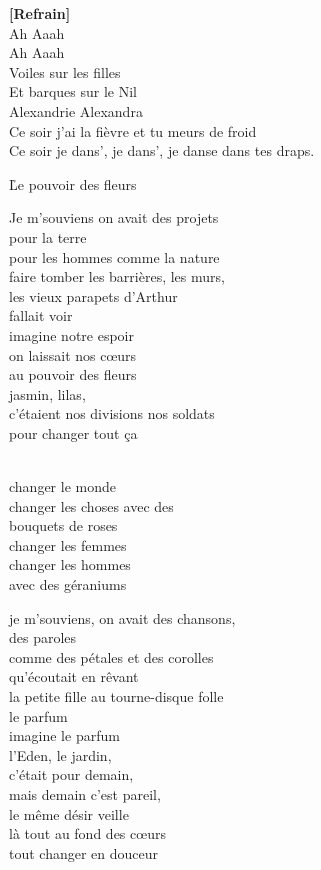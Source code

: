 \documentclass{novel}
\begin{document}
\begin{multicols}{2}
\textbf{[Refrain]} \\

Ah Aaah \\
Ah Aaah \\

Voiles sur les filles \\
Et barques sur le Nil \\
Alexandrie Alexandra \\
Ce soir j'ai la fièvre et tu meurs de froid \\
Ce soir je dans', je dans', je danse dans tes draps. \\
\end{multicols}

\newpage
\footnotesize

\h*{Le pouvoir des fleurs}

\begin{multicols}{2}
Je m'souviens on avait des projets \\
pour la terre \\
pour les hommes comme la nature \\
faire tomber les barrières, les murs, \\
les vieux parapets d'Arthur \\
fallait voir \\
imagine notre espoir \\
on laissait nos cœurs \\
au pouvoir des fleurs \\
jasmin, lilas, \\
c'étaient nos divisions nos soldats \\
pour changer tout ça \\

\begin{bfseries}
[Refrain:]\\
changer le monde \\
changer les choses avec des \\
bouquets de roses \\
changer les femmes \\
changer les hommes \\
avec des géraniums \\
\end{bfseries}

je m'souviens, on avait des chansons, \\
des paroles \\
comme des pétales et des corolles \\
qu'écoutait en rêvant \\
la petite fille au tourne-disque folle \\
le parfum \\
imagine le parfum \\
l'Eden, le jardin, \\
c'était pour demain, \\
mais demain c'est pareil, \\
le même désir veille \\
là tout au fond des cœurs \\
tout changer en douceur \\


\end{multicols}
\end{document}
